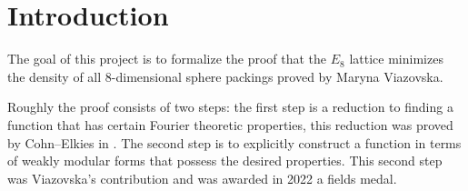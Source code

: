 \section{Introduction}

The goal of this project is to formalize the proof that the $E_8$ lattice minimizes the density of all $8$-dimensional sphere packings proved by
Maryna Viazovska.

Roughly the proof consists of two steps: the first step is a reduction to finding a function that has certain Fourier theoretic properties, this
reduction was proved by Cohn--Elkies in \cite{tba}.
The second step is to explicitly construct a function in terms of weakly modular forms that possess the desired properties. This second step was Viazovska's contribution and was awarded in 2022 a fields medal.



